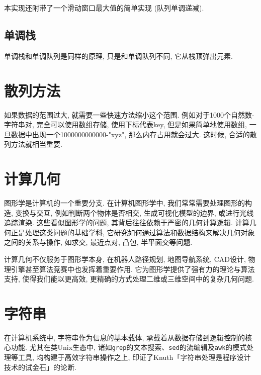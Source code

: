 \documentclass[a4paper]{ctexbook}
\begin{document}
本实现还附带了一个滑动窗口最大值的简单实现 (队列单调递减).



\section{单调栈}

单调栈和单调队列是同样的原理, 只是和单调队列不同, 它从栈顶弹出元素.



\chapter{散列方法}

如果数据的范围过大, 就需要一些快速方法缩小这个范围. 例如对于1000个自然数-字符串对, 完全可以使用数组存储, 使用下标代表key, 但是如果简单地使用数组, 一旦数据中出现一个1000000000000-"xyz", 那么内存占用就会过大. 这时候, 合适的散列方法就相当重要.



\chapter{计算几何}

图形学是计算机的一个重要分支. 在计算机图形学中, 我们常常需要处理图形的构造, 变换与交互, 例如判断两个物体是否相交, 生成可视化模型的边界, 或进行光线追踪渲染. 这些看似图形学的问题, 其背后往往依赖于严密的几何计算逻辑. 计算几何正是处理这类问题的基础学科, 它研究如何通过算法和数据结构来解决几何对象之间的关系与操作, 如求交, 最近点对, 凸包, 半平面交等问题.

计算几何不仅服务于图形学本身, 在机器人路径规划, 地图导航系统, CAD设计, 物理引擎甚至算法竞赛中也发挥着重要作用. 它为图形学提供了强有力的理论与算法支持, 使得我们能以更高效, 更精确的方式处理二维或三维空间中的复杂几何问题.



\chapter{字符串}

在计算机系统中, 字符串作为信息的基本载体, 承载着从数据存储到逻辑控制的核心功能. 尤其在类Unix生态中, 诸如\texttt{grep}的文本搜索、\texttt{sed}的流编辑及\texttt{awk}的模式处理等工具, 均构建于高效字符串操作之上, 印证了Knuth「字符串处理是程序设计技术的试金石」的论断. 
\end{document}
